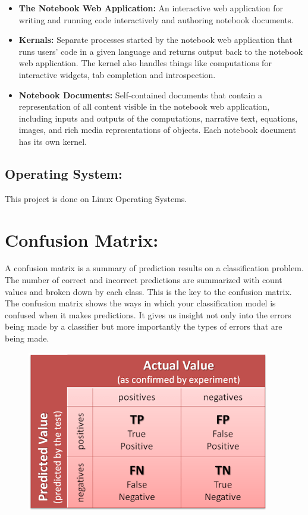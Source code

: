 \documentclass{report}
\begin{document}
\begin{itemize}
\item \textbf{The Notebook Web Application: } An interactive web application for writing and running code interactively and authoring notebook documents.

\item \textbf{Kernals: } Separate processes started by the notebook web application that runs users’ code in a given language and returns output back to the notebook web application. The kernel also handles things like computations for interactive widgets, tab completion and introspection.

\item \textbf{Notebook Documents: } Self-contained documents that contain a representation of all content visible in the notebook web application, including inputs and outputs of the computations, narrative text, equations, images, and rich media representations of objects. Each notebook document has its own kernel.

\end{itemize}

\subsection{Operating System: }
This project is done on Linux Operating Systems.


\section{Confusion Matrix: }
A confusion matrix is a summary of prediction results on a classification problem.
The number of correct and incorrect predictions are summarized with count values and broken down by each class. This is the key to the confusion matrix.
The confusion matrix shows the ways in which your classification model is confused when it makes predictions.
It gives us insight not only into the errors being made by a classifier but more importantly the types of errors that are being made.

\begin{figure}[htbp]
\centering
\includegraphics[height=7cm]{Pictures/confusion_matrix.png}
\caption{}
\label{}
\end{figure}
\end{document}

